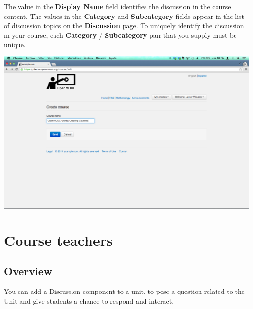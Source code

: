 \documentclass[letterpaper,10pt,english]{sphinxmanual}
\begin{document}
\begin{enumerate}
The value in the \textbf{Display Name} field identifies the discussion in the
course content. The values in the \textbf{Category} and \textbf{Subcategory} fields
appear in the list of discussion topics on the \textbf{Discussion} page. To
uniquely identify the discussion in your course, each \textbf{Category} /
\textbf{Subcategory} pair that you supply must be unique.

\includegraphics{3_create_course-3.png}

\end{enumerate}


\chapter{Course teachers}
\label{course_teachers:course-teachers}\label{course_teachers::doc}\label{course_teachers:id1}

\section{Overview}
\label{course_teachers:overview}
You can add a Discussion component to a unit, to pose a question related to the
Unit and give students a chance to respond and interact.
\end{document}
